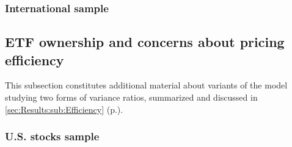 \subsubsection{International sample}
\begin{landscape}
  {\linespread{1.0}
    \begin{table}
      
    \end{table}
    \begin{table}
      
    \end{table}
    \begin{table}
      
    \end{table}
    \begin{table}
      
    \end{table}
  }
\end{landscape}

\subsection{ETF ownership and concerns about pricing efficiency}
\label{app:sec:DetailedResults:Efficiency}
This subsection constitutes additional material about variants of the model studying two forms of variance ratios, summarized and discussed in \autoref{sec:Results:sub:Efficiency} (p.\pageref{sec:Results:sub:Efficiency}).
\subsubsection{U.S. stocks sample}

\begin{landscape}
  {\linespread{1.0}
    \begin{table}
      
    \end{table}
    \begin{table}
      
    \end{table}
    \begin{table}
      
    \end{table}
    \begin{table}
      
    \end{table}
  }
\end{landscape}

